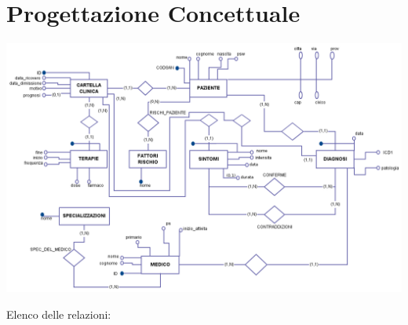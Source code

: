 \documentclass[a4paper,titlepage]{article}
\begin{document}
\begin{frontespizio}


\end{frontespizio}

\tableofcontents

\newpage

\part{Progettazione Concettuale}

\vfill
    \begin{center}
	
\centerline{
    \includegraphics[scale=0.45]{ER.png}
}
    \end{center}
\vfill
\newpage
{\large Elenco delle relazioni:}\newline
\end{document}
